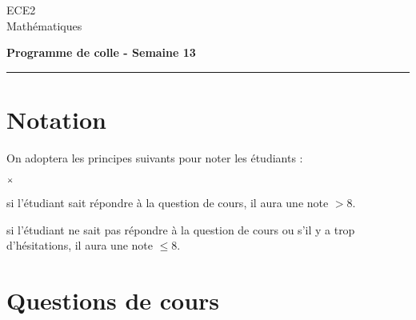 \documentclass[11pt]{article}%
\begin{document}
\begin{flushleft}
ECE2 \\
Mathématiques
\end{flushleft}


\vspace{0.1cm}

\begin{center}
\textbf{\Large{Programme de colle - Semaine 13}}
\end{center}

\hrule

\vspace*{0,2cm}

\section*{Notation}

\noindent
On adoptera les principes suivants pour noter les étudiants :
\begin{noliste}{$\scriptstyle \times$}
\item si l'étudiant sait répondre à la question de cours, il 
aura une note $>8$.
\item si l'étudiant ne sait pas répondre à la question de 
cours ou s'il y a trop d'hésitations, il aura une note $\leq 8$.
\end{noliste}


\section*{Questions de cours}
\end{document}
